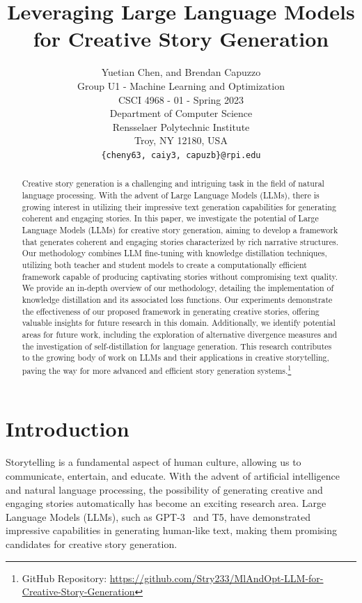 \documentclass{article} %
\title{Leveraging Large Language Models for Creative Story Generation}
\author{Yuetian Chen, and Brendan Capuzzo \\
Group U1 - Machine Learning and Optimization \\
CSCI 4968 - 01 - Spring 2023\\
Department of Computer Science\\
Rensselaer Polytechnic Institute\\
Troy, NY 12180, USA \\
\texttt{\{cheny63, caiy3, capuzb\}@rpi.edu} \\
}
\begin{document}
\maketitle

\begin{abstract}
Creative story generation is a challenging and intriguing task in the field of natural language processing. With the advent of Large Language Models (LLMs), there is growing interest in utilizing their impressive text generation capabilities for generating coherent and engaging stories. In this paper, we investigate the potential of Large Language Models (LLMs) for creative story generation, aiming to develop a framework that generates coherent and engaging stories characterized by rich narrative structures. Our methodology combines LLM fine-tuning with knowledge distillation techniques, utilizing both teacher and student models to create a computationally efficient framework capable of producing captivating stories without compromising text quality. We provide an in-depth overview of our methodology, detailing the implementation of knowledge distillation and its associated loss functions. Our experiments demonstrate the effectiveness of our proposed framework in generating creative stories, offering valuable insights for future research in this domain. Additionally, we identify potential areas for future work, including the exploration of alternative divergence measures and the investigation of self-distillation for language generation. This research contributes to the growing body of work on LLMs and their applications in creative storytelling, paving the way for more advanced and efficient story generation systems.\footnote{GitHub Repository: \hyperref[github.com/Stry233/MlAndOpt-LLM-for-Creative-Story-Generation]{https://github.com/Stry233/MlAndOpt-LLM-for-Creative-Story-Generation}}
\end{abstract}

\section{Introduction}

Storytelling is a fundamental aspect of human culture, allowing us to communicate, entertain, and educate. With the advent of artificial intelligence and natural language processing, the possibility of generating creative and engaging stories automatically has become an exciting research area. Large Language Models (LLMs), such as GPT-3~\cite{brown2020language} and T5, have demonstrated impressive capabilities in generating human-like text, making them promising candidates for creative story generation.
\end{document}
